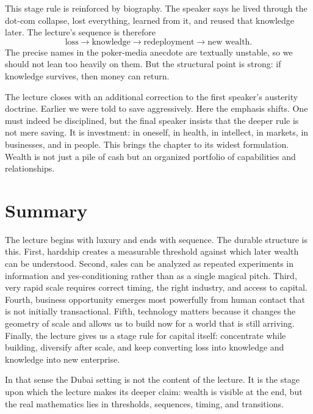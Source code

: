 This stage rule is reinforced by biography. The speaker says he lived through the dot-com collapse, lost everything, learned from it, and reused that knowledge later. The lecture's sequence is therefore
\begin{equation}
\text{loss} \to \text{knowledge} \to \text{redeployment} \to \text{new wealth}.
\end{equation}
The precise names in the poker-media anecdote are textually unstable, so we should not lean too heavily on them. But the structural point is strong: if knowledge survives, then money can return.

The lecture closes with an additional correction to the first speaker's austerity doctrine. Earlier we were told to save aggressively. Here the emphasis shifts. One must indeed be disciplined, but the final speaker insists that the deeper rule is not mere saving. It is investment: in oneself, in health, in intellect, in markets, in businesses, and in people. This brings the chapter to its widest formulation. Wealth is not just a pile of cash but an organized portfolio of capabilities and relationships.

\section{Summary}

The lecture begins with luxury and ends with sequence. The durable structure is this. First, hardship creates a measurable threshold against which later wealth can be understood. Second, sales can be analyzed as repeated experiments in information and yes-conditioning rather than as a single magical pitch. Third, very rapid scale requires correct timing, the right industry, and access to capital. Fourth, business opportunity emerges most powerfully from human contact that is not initially transactional. Fifth, technology matters because it changes the geometry of scale and allows us to build now for a world that is still arriving. Finally, the lecture gives us a stage rule for capital itself: concentrate while building, diversify after scale, and keep converting loss into knowledge and knowledge into new enterprise.

In that sense the Dubai setting is not the content of the lecture. It is the stage upon which the lecture makes its deeper claim: wealth is visible at the end, but the real mathematics lies in thresholds, sequences, timing, and transitions.